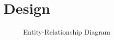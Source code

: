 \section{Design}

\begin{figure}[h]
    \begin{center}
        
    \end{center}
    \caption{Entity-Relationship Diagram}
    \label{fig:erd}
\end{figure}
